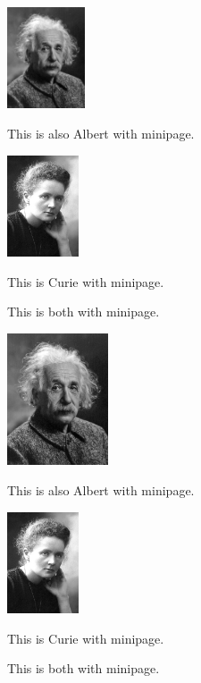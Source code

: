 \documentclass[12pt,a4paper]{article}
\begin{document}
\begin{figure}
	\centering

	\begin{minipage}[h!]{3cm}
		\centering
		\includegraphics[height=3cm]{albert.jpg}
		\caption{This is also Albert with minipage.} \label{sub31}
	\end{minipage}

	\begin{minipage}[h!]{3cm}
		\centering
		\includegraphics[height=30mm]{curie.jpg}
		\caption{This is Curie with minipage.} \label{sub32}
	\end{minipage}
	
	\caption{This is both with minipage.} \label{fig3}

\end{figure}





\begin{figure}
	\centering

	\begin{minipage}[h!]{5cm}
		\centering
		\includegraphics[width=3cm]{albert.jpg}
		\caption{This is also Albert with minipage.} \label{sub41}
	\end{minipage}

	\begin{minipage}[h!]{5cm}
		\centering
		\includegraphics[height=30mm]{curie.jpg}
		\caption{This is Curie with minipage.} \label{sub42}
	\end{minipage}
	
	\caption{This is both with minipage.} \label{fig4}

\end{figure}
\end{document}

